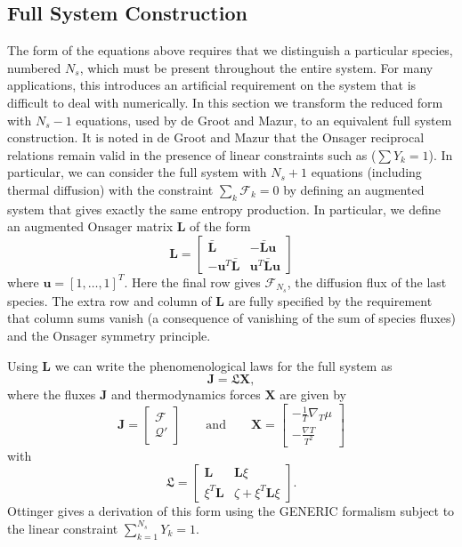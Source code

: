 \documentclass[11pt]{article}
\newcommand{\HeatFlux}{\boldsymbol{\mathcal{Q}}}
\newcommand{\SpeciesFlux}{\boldsymbol{\mathcal{F}}}
\newcommand{\OnsagerMatrix}{\boldsymbol{\mathfrak{L}}}
\newcommand{\OnesVector}{\mathbf{u}}
\newcommand{\Lbar}{\bar{\mathbf{L}}}
\begin{document}
\subsection{Full System Construction}

The form of the equations above requires that we distinguish a particular species, numbered $N_s$, which must be present
throughout the entire system. For many applications, this introduces an artificial requirement on the system
that is difficult to deal with numerically.
In this section we transform the reduced form with $N_s-1$ equations, used by de Groot and Mazur, to an equivalent full system construction.
It is noted in de Groot and Mazur that the Onsager reciprocal relations remain valid in the presence
of linear constraints such as ($\sum Y_k = 1$).
In particular, we can consider the full system with $N_s+1$ equations (including thermal diffusion) with
the constraint $\sum_k \mathcal{F}_k  = 0$
by defining an augmented system that gives exactly the same entropy production.
In particular, we define an augmented Onsager matrix $\mathbf{L}$ of the form
\[
{\mathbf{L}} =
\begin{bmatrix}
\Lbar & -{\Lbar}\OnesVector \\
- \OnesVector^T {\Lbar} & \OnesVector^T\Lbar \OnesVector
\end{bmatrix}
\]
where $\OnesVector = [1,\ldots,1]^T$.  Here the final row gives $\SpeciesFlux_{N_s}$, the diffusion flux of the last species.
The extra row and column of ${\mathbf{L}}$ are fully specified by the
requirement that column sums vanish (a consequence of vanishing of the sum of
species fluxes) and the Onsager symmetry principle.

Using ${\mathbf{L}}$ we can write the phenomenological laws
for the full system as
\[
{\mathbf{J}} = {\OnsagerMatrix} {\mathbf{X}},
\]
where the fluxes ${\mathbf{J}}$ and thermodynamics forces ${\mathbf{X}}$ are given by
\[
{\mathbf{J}} =
\begin{bmatrix}
{\SpeciesFlux}
\\
\HeatFlux'
\end{bmatrix}
\qquad \mathrm{and} \qquad
{\mathbf{X}} = \begin{bmatrix}
- \frac{1}{T} \nabla_T  \mu
\\
-\frac{ \nabla T }{ T^2 }
\end{bmatrix}
\]
with
\begin{equation}
{\OnsagerMatrix} =
\begin{bmatrix}
{{\mathbf{L}}} & {{\mathbf{L}} {\xi}}
\\
{\xi}^T{{\mathbf{L}}} & \zeta + {\xi}^T {{\mathbf{L}}} {\xi}
\end{bmatrix}.
\label{eq:L_xi}
\end{equation}
Ottinger \cite{Ottinger_09} gives a derivation of this
form using the GENERIC formalism subject to the linear constraint $\sum_{k=1}^{N_s} Y_k=1$.
\end{document}
